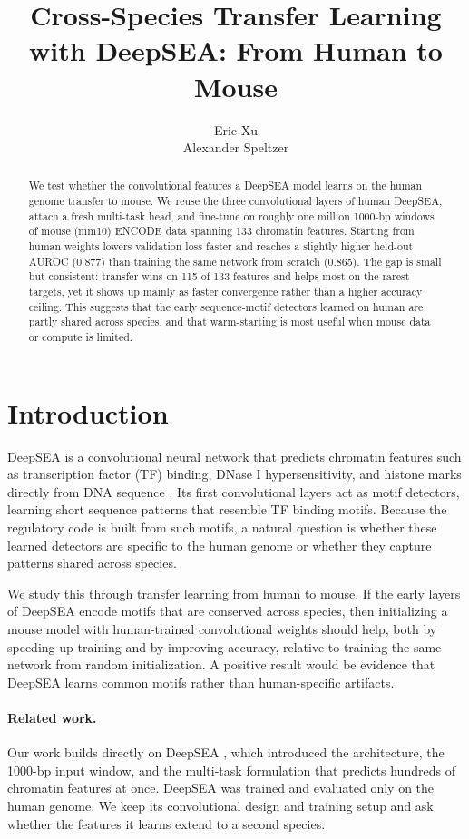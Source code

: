 \documentclass{article}
\title{Cross-Species Transfer Learning with DeepSEA: From Human to Mouse}
\author{%
  Eric Xu \\
  \And
  Alexander Speltzer \\
}
\begin{document}
\maketitle

\begin{abstract}
We test whether the convolutional features a DeepSEA model learns on the human
genome transfer to mouse. We reuse the three convolutional layers of human
DeepSEA, attach a fresh multi-task head, and fine-tune on roughly one million
1000-bp windows of mouse (mm10) ENCODE data spanning 133 chromatin features.
Starting from human weights lowers validation loss faster and reaches a slightly
higher held-out AUROC (0.877) than training the same network from scratch
(0.865). The gap is small but consistent: transfer wins on 115 of 133 features
and helps most on the rarest targets, yet it shows up mainly as faster
convergence rather than a higher accuracy ceiling. This suggests that the early
sequence-motif detectors learned on human are partly shared across species, and
that warm-starting is most useful when mouse data or compute is limited.
\end{abstract}

\section{Introduction}

DeepSEA is a convolutional neural network that predicts chromatin features such
as transcription factor (TF) binding, DNase I hypersensitivity, and histone
marks directly from DNA sequence \citep{zhou2015deepsea}. Its first
convolutional layers act as motif detectors, learning short sequence patterns
that resemble TF binding motifs. Because the regulatory code is built from such
motifs, a natural question is whether these learned detectors are specific to the
human genome or whether they capture patterns shared across species.

We study this through transfer learning from human to mouse. If the early layers
of DeepSEA encode motifs that are conserved across species, then initializing a
mouse model with human-trained convolutional weights should help, both by
speeding up training and by improving accuracy, relative to training the same
network from random initialization. A positive result would be evidence that
DeepSEA learns common motifs rather than human-specific artifacts.

\paragraph{Related work.}
Our work builds directly on DeepSEA \citep{zhou2015deepsea}, which introduced the
architecture, the 1000-bp input window, and the multi-task formulation that
predicts hundreds of chromatin features at once. DeepSEA was trained and
evaluated only on the human genome. We keep its convolutional design and
training setup and ask whether the features it learns extend to a second species.
\end{document}
